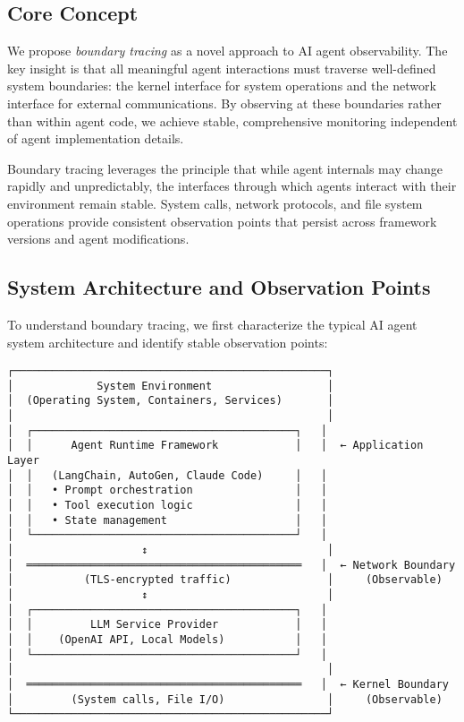 \documentclass[sigplan,screen，review,9pt]{acmart}
\begin{document}
\subsection{Core Concept}

We propose \emph{boundary tracing} as a novel approach to AI agent observability. The key insight is that all meaningful agent interactions must traverse well-defined system boundaries: the kernel interface for system operations and the network interface for external communications. By observing at these boundaries rather than within agent code, we achieve stable, comprehensive monitoring independent of agent implementation details.

Boundary tracing leverages the principle that while agent internals may change rapidly and unpredictably, the interfaces through which agents interact with their environment remain stable. System calls, network protocols, and file system operations provide consistent observation points that persist across framework versions and agent modifications.

\subsection{System Architecture and Observation Points}

To understand boundary tracing, we first characterize the typical AI agent system architecture and identify stable observation points:

\begin{center}
\begin{Verbatim}[fontsize=\small, commandchars=\\\{\}]
┌─────────────────────────────────────────────────┐
│             System Environment                  │
│  (Operating System, Containers, Services)       │
│                                                 │
│  ┌─────────────────────────────────────────┐   │
│  │      Agent Runtime Framework            │   │  ← Application Layer
│  │   (LangChain, AutoGen, Claude Code)     │   │
│  │   • Prompt orchestration                │   │
│  │   • Tool execution logic                │   │
│  │   • State management                    │   │
│  └─────────────────────────────────────────┘   │
│                    ↕                            │
│  ═══════════════════════════════════════════   │  ← Network Boundary
│           (TLS-encrypted traffic)               │     (Observable)
│                    ↕                            │
│  ┌─────────────────────────────────────────┐   │
│  │         LLM Service Provider            │   │
│  │    (OpenAI API, Local Models)           │   │
│  └─────────────────────────────────────────┘   │
│                                                 │
│  ═══════════════════════════════════════════   │  ← Kernel Boundary
│         (System calls, File I/O)                │     (Observable)
└─────────────────────────────────────────────────┘
\end{Verbatim}
\end{center}
\end{document}
